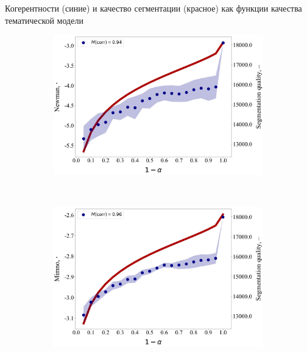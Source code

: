 \documentclass[sans, mathsans, russian]{beamer}
\begin{document}
\begin{frame}{Когерентности (синие) и качество сегментации (красное) как функции качества тематической модели}
  
  \begin{figure}[h]
    \begin{subfigure}[t]{0.48\textwidth}
      \includegraphics[width=\linewidth]{newman-iteration.jpg}
    \end{subfigure}
    ~
    \begin{subfigure}[t]{0.48\textwidth}
      \includegraphics[width=\linewidth]{mimno-iteration.jpg}
    \end{subfigure}
    \begin{subfigure}[t]{0.48\textwidth}

\end{subfigure}
\end{figure}
\end{frame}
\end{document}
